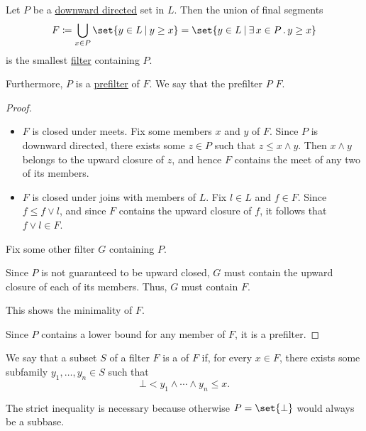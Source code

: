 \begin{proposition}\label{thm:filter_from_prefilter}
  Let \( P \) be a \hyperref[def:directed_set]{downward directed} set in \( L \). Then the union of final segments
  \begin{equation*}
    F \coloneqq \bigcup_{x \in P} \set{ y \in L \given y \geq x } = \set{ y \in L \given \qexists{x \in P} y \geq x }
  \end{equation*}
  is the smallest \hyperref[def:lattice_ideal/ideal]{filter} containing \( P \).

  Furthermore, \( P \) is a \hyperref[def:prefilter]{prefilter} of \( F \). We say that the prefilter \( P \)  \( F \).
\end{proposition}
\begin{proof}

  \begin{itemize}
    \item \( F \) is closed under meets. Fix some members \( x \) and \( y \) of \( F \). Since \( P \) is downward directed, there exists some \( z \in P \) such that \( z \leq x \wedge y \). Then \( x \wedge y \) belongs to the upward closure of \( z \), and hence \( F \) contains the meet of any two of its members.

    \item \( F \) is closed under joins with members of \( L \). Fix \( l \in L \) and \( f \in F \). Since \( f \leq f \vee l \), and since \( F \) contains the upward closure of \( f \), it follows that \( f \vee l \in F \).
  \end{itemize}

   Fix some other filter \( G \) containing \( P \).

  Since \( P \) is not guaranteed to be upward closed, \( G \) must contain the upward closure of each of its members. Thus, \( G \) must contain \( F \).

  This shows the minimality of \( F \).

   Since \( P \) contains a lower bound for any member of \( F \), it is a prefilter.
\end{proof}

\begin{definition}\label{def:filter_subbase}\mimprovised
  We say that a subset \( S \) of a filter \( F \) is a  of \( F \) if, for every \( x \in F \), there exists some subfamily \( y_1, \ldots, y_n \in S \) such that
  \begin{equation}\label{eq:def:filter_subbase}
    \bot < y_1 \wedge \cdots \wedge y_n \leq x.
  \end{equation}
\end{definition}
\begin{comments}
  \item The strict inequality is necessary because otherwise \( P = \set{ \bot } \) would always be a subbase.
\end{comments}

